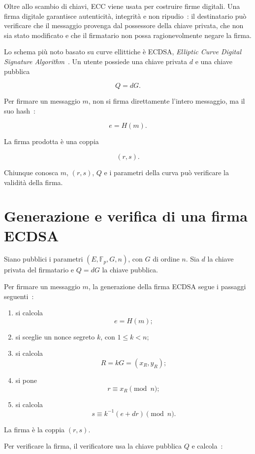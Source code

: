 \documentclass[12pt,a4paper,oneside]{report}
\begin{document}
Oltre allo scambio di chiavi, ECC viene usata per costruire firme digitali. Una firma digitale garantisce autenticità, integrità e non ripudio~\cite{margara_firma}: il destinatario può verificare che il messaggio provenga dal possessore della chiave privata, che non sia stato modificato e che il firmatario non possa ragionevolmente negare la firma.

Lo schema più noto basato su curve ellittiche è ECDSA, \textit{Elliptic Curve Digital Signature Algorithm}~\cite{fips_186_5,sec1}. Un utente possiede una chiave privata \(d\) e una chiave pubblica

\[
Q=dG.
\]

Per firmare un messaggio \(m\), non si firma direttamente l'intero messaggio, ma il suo hash~\cite{margara_firma,fips_186_5}:

\[
e=H(m).
\]

La firma prodotta è una coppia

\[
(r,s).
\]

Chiunque conosca \(m\), \((r,s)\), \(Q\) e i parametri della curva può verificare la validità della firma.

\section{Generazione e verifica di una firma ECDSA}

Siano pubblici i parametri \((E,\mathbb{F}_p,G,n)\), con \(G\) di ordine \(n\). Sia \(d\) la chiave privata del firmatario e \(Q=dG\) la chiave pubblica.

Per firmare un messaggio \(m\), la generazione della firma ECDSA segue i passaggi seguenti~\cite{fips_186_5,sec1}:

\begin{enumerate}
    \item si calcola
    \[
    e=H(m);
    \]
    \item si sceglie un nonce segreto \(k\), con \(1\leq k<n\);
    \item si calcola
    \[
    R=kG=(x_R,y_R);
    \]
    \item si pone
    \[
    r\equiv x_R \pmod n;
    \]
    \item si calcola
    \[
    s\equiv k^{-1}(e+dr)\pmod n.
    \]
\end{enumerate}

La firma è la coppia \((r,s)\).

Per verificare la firma, il verificatore usa la chiave pubblica \(Q\) e calcola~\cite{fips_186_5,sec1}:
\end{document}
